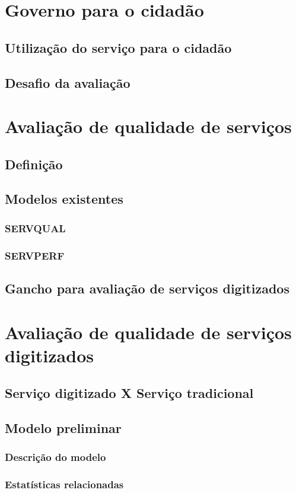 \section{Governo para o cidadão}
\subsection{Utilização do serviço para o cidadão}
\subsection{Desafio da avaliação}

\section{Avaliação de qualidade de serviços}
\subsection{Definição}
\subsection{Modelos existentes}
\subsubsection{SERVQUAL}
\subsubsection{SERVPERF}
\subsection{Gancho para avaliação de serviços digitizados}

\section{Avaliação de qualidade de serviços digitizados}
\subsection{Serviço digitizado X Serviço tradicional}
\subsection{Modelo preliminar}
\subsubsection{Descrição do modelo}
\subsubsection{Estatísticas relacionadas}